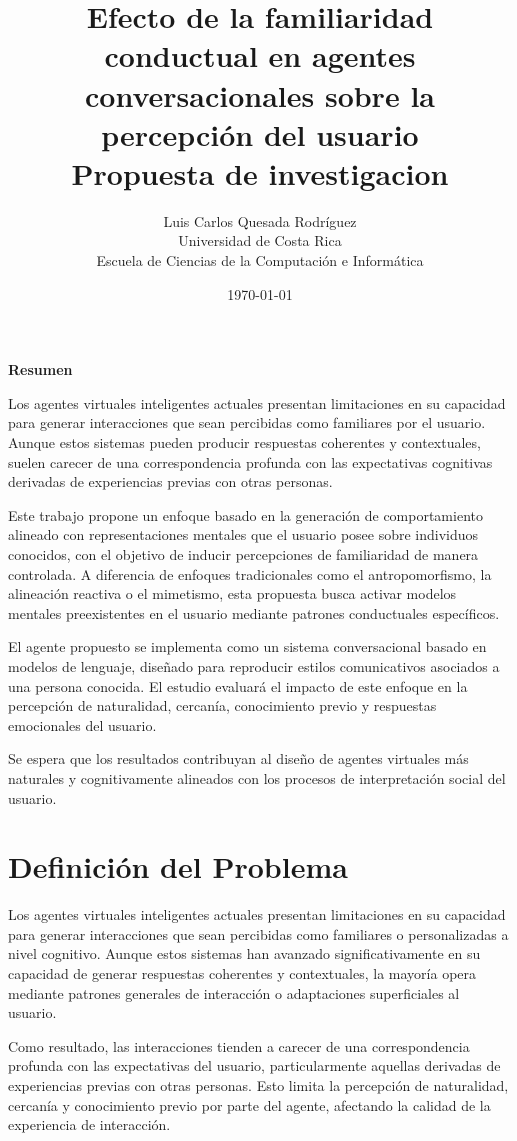 \documentclass[12pt]{article}
\title{
    \textbf{Efecto de la familiaridad conductual en agentes conversacionales sobre la percepción del usuario}\\
    \large Propuesta de investigacion
}
\author{
    Luis Carlos Quesada Rodríguez \\
    Universidad de Costa Rica \\
    Escuela de Ciencias de la Computación e Informática
}
\date{\today}
\begin{document}
\maketitle

\textbf{Resumen}

Los agentes virtuales inteligentes actuales presentan limitaciones en su capacidad para generar interacciones que sean percibidas como familiares por el usuario. Aunque estos sistemas pueden producir respuestas coherentes y contextuales, suelen carecer de una correspondencia profunda con las expectativas cognitivas derivadas de experiencias previas con otras personas.

Este trabajo propone un enfoque basado en la generación de comportamiento alineado con representaciones mentales que el usuario posee sobre individuos conocidos, con el objetivo de inducir percepciones de familiaridad de manera controlada. A diferencia de enfoques tradicionales como el antropomorfismo, la alineación reactiva o el mimetismo, esta propuesta busca activar modelos mentales preexistentes en el usuario mediante patrones conductuales específicos.

El agente propuesto se implementa como un sistema conversacional basado en modelos de lenguaje, diseñado para reproducir estilos comunicativos asociados a una persona conocida. El estudio evaluará el impacto de este enfoque en la percepción de naturalidad, cercanía, conocimiento previo y respuestas emocionales del usuario.

Se espera que los resultados contribuyan al diseño de agentes virtuales más naturales y cognitivamente alineados con los procesos de interpretación social del usuario.


\section{Definición del Problema}

Los agentes virtuales inteligentes actuales presentan limitaciones en su capacidad para generar interacciones que sean percibidas como familiares o personalizadas a nivel cognitivo. Aunque estos sistemas han avanzado significativamente en su capacidad de generar respuestas coherentes y contextuales, la mayoría opera mediante patrones generales de interacción o adaptaciones superficiales al usuario.

Como resultado, las interacciones tienden a carecer de una correspondencia profunda con las expectativas del usuario, particularmente aquellas derivadas de experiencias previas con otras personas. Esto limita la percepción de naturalidad, cercanía y conocimiento previo por parte del agente, afectando la calidad de la experiencia de interacción.
\end{document}
